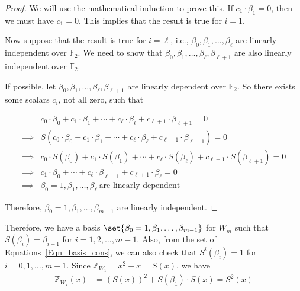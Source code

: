 \begin{proof}
	We will use the mathematical induction to prove this. If $c_1\cdot \beta_1=0$, then we must have $c_1=0$. This implies that the result is true for $i=1$. 
	
	Now suppose that the result is true for $i=\ell$, i.e., $\beta_{0}, \beta_{1},\ldots, \beta_{\ell}$ are linearly independent over $\mathbb{F}_2$. We need to show that $\beta_{0}, \beta_{1},\ldots, \beta_{\ell}, \beta_{\ell+1}$ are also linearly independent over $\mathbb{F}_2$. 
	
	If possible, let $\beta_{0}, \beta_{1},\ldots, \beta_{\ell}, \beta_{\ell+1}$ are linearly dependent over $\mathbb{F}_2$. So there exists some scalars $c_i$, not all zero, such that 
	
	\begin{equation*}
		\begin{aligned}
			& c_0\cdot \beta_{0} + c_1\cdot \beta_{1}+ \cdots + c_{\ell}\cdot \beta_{\ell}+ c_{\ell+1}\cdot \beta_{\ell+1}=0\\
			\implies & S(c_0\cdot \beta_{0} + c_1\cdot \beta_{1}+ \cdots + c_{\ell}\cdot \beta_{\ell}+ c_{\ell+1}\cdot \beta_{\ell+1})=0\\
			\implies & c_{0}\cdot S(\beta_{0}) + c_{1}\cdot S(\beta_{1})+ \cdots + c_{\ell}\cdot S(\beta_{\ell})+ c_{\ell +1}\cdot S(\beta_{\ell+1})=0\\
			\implies & c_1\cdot \beta_{0}+ \cdots + c_{\ell}\cdot \beta_{\ell-1}+ c_{\ell+1}\cdot \beta_{\ell}=0\\
			\implies & \beta_{0}=1, \beta_{1},\ldots, \beta_{\ell}~\text{are linearly dependent}
		\end{aligned}
	\end{equation*}
	
	Therefore, $\beta_{0}=1, \beta_{1},\ldots, \beta_{m-1}$ are linearly independent.
\end{proof}



Therefore, we have a basis $\set{\beta_{0}=1, \beta_{1},\ldots, \beta_{m-1}}$ for $W_m$ such that $S({\beta_{i}})=\beta_{i-1}$ for $i=1,2,\ldots,m-1$. Also, from the set of Equations~\ref{Eqn_basis_cons}, we can also check that $S^{i}(\beta_{i})=1$ for $i=0,1,\ldots,m-1$. Since $\mathbb{Z}_{W_{1}}=x^2+x=S(x)$, we have
\begin{equation*}
	\begin{aligned}
		\mathbb{Z}_{W_{2}}(x)&= (S(x))^2+ S(\beta_{1})\cdot S(x)= S^2(x)
	\end{aligned}
\end{equation*}

